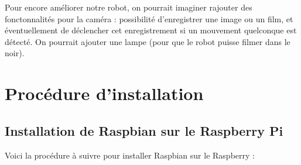 \documentclass[12pt,a4paper]{report}
\begin{document}
Pour encore améliorer notre robot, on pourrait imaginer rajouter des fonctonnalités pour la caméra : possibilité d'enregistrer une image ou un film, et éventuellement de déclencher cet enregistrement si un mouvement quelconque est détecté. On pourrait ajouter une lampe (pour que le robot puisse filmer dans le noir).

\appendix

\chapter{Procédure d'installation}

\section{Installation de Raspbian sur le Raspberry Pi}

Voici la procédure à suivre pour installer Raspbian sur le Raspberry :
\end{document}
